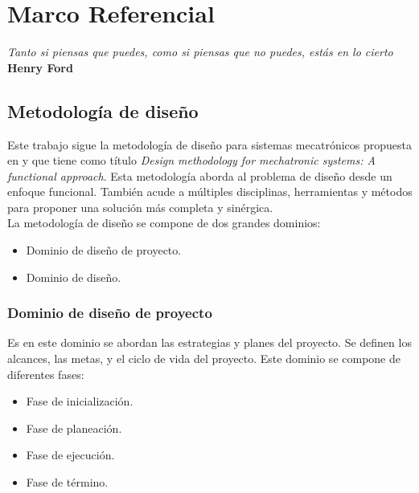 \chapter{Marco Referencial} \label{ch:marcoref}

\begin{flushright}
\small\textit{Tanto si piensas que puedes, como si piensas que no puedes, est\'as en lo cierto}\\
		\small\textbf{Henry Ford}
\end{flushright}

	\section{Metodolog\'ia de dise\~{n}o} \label{sec:metodologia}
Este trabajo sigue la metodolog\'ia de dise\~{n}o para sistemas mecatr\'onicos propuesta en \cite{diegoflores_2018} y que tiene como t\'itulo \textit{Design methodology for mechatronic systems: A functional approach}. Esta metodolog\'ia aborda al problema de dise\~{n}o desde un enfoque funcional. Tambi\'en acude a m\'ultiples disciplinas, herramientas y m\'etodos para proponer una soluci\'on m\'as completa y sin\'ergica.\\

\noindent La metodolog\'ia de dise\~{n}o se compone de dos grandes dominios:

\begin{itemize}
	\item Dominio de dise\~{n}o de proyecto.
	\item Dominio de dise\~{n}o.
\end{itemize}

		\subsection*{Dominio de dise\~{n}o de proyecto}
\noindent Es en este dominio se abordan las estrategias y planes del proyecto. Se definen los alcances, las metas, y el ciclo de vida del proyecto. Este dominio se compone de diferentes fases:

\begin{itemize}
	\item Fase de inicializaci\'on. 
	\item Fase de planeaci\'on.
	\item Fase de ejecuci\'on.
	\item Fase de t\'ermino.
\end{itemize}

